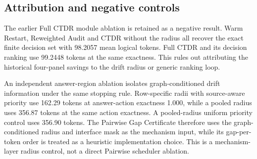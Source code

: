 \documentclass[11pt]{article}
\begin{document}
\begin{table}[t]
\centering\small
{}
\caption{Semantic relay-interface drift panel. Exact recovery is a finite worker-reference diagnostic.}
\end{table}

\subsection{Attribution and negative controls}
The earlier Full CTDR module ablation is retained as a negative result. Warm
Restart, Reweighted Audit and CTDR without the radius all recover the exact
finite decision set with 98.2057 mean logical tokens. Full CTDR and its decision
ranking use 99.2448 tokens at the same exactness. This rules out attributing the
historical four-panel savings to the drift radius or generic ranking loop.

An independent answer-region ablation isolates graph-conditioned drift
information under the same stopping rule. Row-specific radii with source-aware
priority use 162.29 tokens at answer-action exactness 1.000, while a pooled
radius uses 356.87 tokens at the same action exactness. A pooled-radius uniform
priority control uses 356.90 tokens. The Pairwise Gap Certificate therefore
uses the graph-conditioned radius and interface mask as the mechanism input,
while its gap-per-token order is treated as a heuristic implementation choice.
This is a mechanism-layer radius control, not a direct Pairwise scheduler
ablation.
\end{document}
